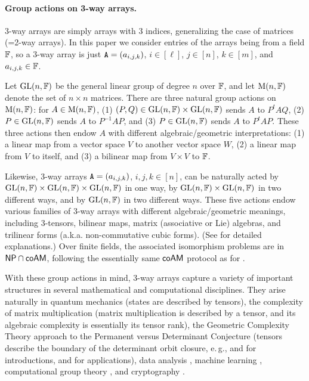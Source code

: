 \paragraph{Group actions on 3-way arrays.} 3-way arrays 
are simply arrays with 3 indices, generalizing the case of matrices (=2-way arrays). In this paper we consider entries of the arrays being from a field 
$\mathbb{F}$, so a 3-way array is just $\mathtt{A}=(a_{i,j,k})$, $i\in[\ell]$, $j\in[n]$, 
$k\in[m]$, and $a_{i,j,k}\in\mathbb{F}$. 

Let $\mathrm{GL}(n, \mathbb{F})$ be the general linear group of degree $n$ over $\mathbb{F}$, and let 
$\mathrm{M}(n,\mathbb{F})$ denote the set of $n \times n$ matrices. There are three natural group 
actions on $\mathrm{M}(n,\mathbb{F})$: for $A \in \mathrm{M}(n,\mathbb{F})$, (1) $(P,Q) \in \mathrm{GL}(n,\mathbb{F}) \times 
\mathrm{GL}(n,\mathbb{F})$ sends $A$ to $P^t A Q$, (2) $P \in \mathrm{GL}(n,\mathbb{F})$ sends $A$ to $P^{-1} A 
P$, and (3) $P \in \mathrm{GL}(n,\mathbb{F})$ sends $A$ to $P^t A P$.
These three actions 
then endow $A$ with different algebraic/geometric interpretations: (1) a linear map 
from a vector space $V$ to another vector space $W$, (2) a linear map from $V$ to 
itself, and (3) a bilinear map from $V\times V$ to $\mathbb{F}$. 

Likewise, 3-way arrays $\mathtt{A}=(a_{i,j,k})$, $i, j, k\in[n]$, can be naturally acted 
by $\mathrm{GL}(n, \mathbb{F})\times \mathrm{GL}(n, \mathbb{F})\times \mathrm{GL}(n, \mathbb{F})$ in one way, by $\mathrm{GL}(n, \mathbb{F})\times 
\mathrm{GL}(n, \mathbb{F})$ in two different ways, and by $\mathrm{GL}(n, \mathbb{F})$ in two different ways. 
These five actions endow various families of 3-way arrays with 
different algebraic/geometric 
meanings, including 3-tensors, bilinear maps, matrix (associative or Lie) 
algebras, and trilinear forms (a.k.a. 
non-commutative cubic forms). (See  for detailed explanations.) 
Over finite fields, the associated isomorphism problems are in $\mathsf{NP}\cap\mathsf{coAM}$, following the essentially same 
$\mathsf{coAM}$ 
protocol as for \GI. 


With these group actions in mind, 3-way arrays capture a variety of important structures in several mathematical and computational disciplines. 
They arise naturally in quantum mechanics (states are described by 
tensors), the complexity of matrix multiplication (matrix multiplication is
described by a tensor, and its algebraic complexity is essentially its tensor 
rank), the Geometric Complexity Theory approach \cite{Mul11} to the Permanent versus 
Determinant Conjecture \cite{Val79} (tensors describe the boundary of the 
determinant orbit 
closure, e.\,g., \cite[Sec.~13.6.3]{Lan12} and
\cite[Sec.~3.5.1]{grochowPhD} for introductions,
and \cite{HL16, H17} for applications), data analysis \cite{KB09},  
machine learning 
\cite{PSS18}, computational group theory \cite{LQ17, BMW18}, and cryptography 
\cite{Pat96,JQSY19}.



